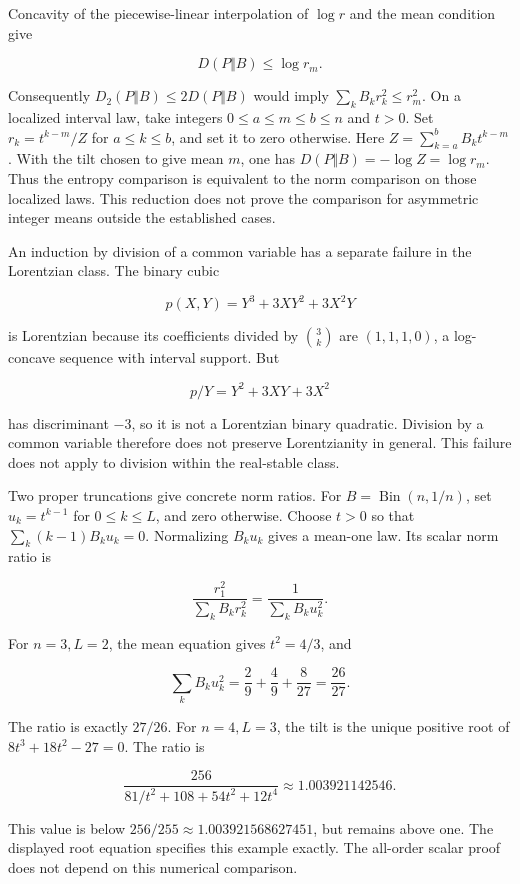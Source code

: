 Concavity of the piecewise-linear interpolation of \(\log r\) and the mean condition give

\[
D(P\Vert B)\le\log r_m.
\]

Consequently \(D_2(P\Vert B)\le2D(P\Vert B)\) would imply \(\sum_kB_kr_k^2\le r_m^2\). On a localized interval law, take integers \(0\le a\le m\le b\le n\) and \(t>0\). Set \(r_k=t^{k-m}/Z\) for \(a\le k\le b\), and set it to zero otherwise. Here \(Z=\sum_{k=a}^bB_kt^{k-m}\). With the tilt chosen to give mean \(m\), one has \(D(P\Vert B)=-\log Z=\log r_m\). Thus the entropy comparison is equivalent to the norm comparison on those localized laws. This reduction does not prove the comparison for asymmetric integer means outside the established cases.

An induction by division of a common variable has a separate failure in the Lorentzian class. The binary cubic

\[
p(X,Y)=Y^3+3XY^2+3X^2Y
\]

is Lorentzian because its coefficients divided by \(\binom3k\) are \((1,1,1,0)\), a log-concave sequence with interval support. But

\[
p/Y=Y^2+3XY+3X^2
\]

has discriminant \(-3\), so it is not a Lorentzian binary quadratic. Division by a common variable therefore does not preserve Lorentzianity in general. This failure does not apply to division within the real-stable class.

Two proper truncations give concrete norm ratios. For \(B=\operatorname{Bin}(n,1/n)\), set \(u_k=t^{k-1}\) for \(0\le k\le L\), and zero otherwise. Choose \(t>0\) so that \(\sum_k(k-1)B_ku_k=0\). Normalizing \(B_ku_k\) gives a mean-one law. Its scalar norm ratio is

\[
\frac{r_1^2}{\sum_kB_kr_k^2}=\frac1{\sum_kB_ku_k^2}.
\]

For \(n=3,L=2\), the mean equation gives \(t^2=4/3\), and

\[
\sum_kB_ku_k^2=\frac29+\frac49+\frac8{27}=\frac{26}{27}.
\]

The ratio is exactly \(27/26\). For \(n=4,L=3\), the tilt is the unique positive root of \(8t^3+18t^2-27=0\). The ratio is

\[
\frac{256}{81/t^2+108+54t^2+12t^4}
\approx1.003921142546.
\]

This value is below \(256/255\approx1.003921568627451\), but remains above one. The displayed root equation specifies this example exactly. The all-order scalar proof does not depend on this numerical comparison.


